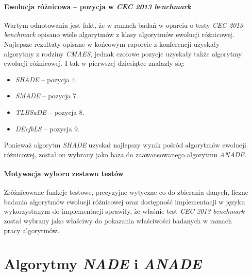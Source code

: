 \documentclass[12pt,a4paper]{report}
\begin{document}
{{{{{{\subsubsection{Ewolucja różnicowa -- pozycja w \emph{CEC 2013 benchmark}}
\par{
Wartym odnotowania jest fakt, że w ramach badań w oparciu o testy \emph{CEC 2013 benchmark} opisano wiele algorytmów z klasy algorytmów ewolucji różnicowej. Najlepsze rezultaty opisane w końcowym raporcie z konferencji \cite{CEC2013Comp} uzyskały algorytmy z rodziny \emph{CMAES}, jednak czołowe pozycje uzyskały także algorytmy ewolucji różnicowej. I tak w pierwszej dziesiątce znalazły się:
\begin{itemize}
\item \emph{SHADE} \cite{SHADE} -- pozycja 4.
\item \emph{SMADE} \cite{SMADE} -- pozycja 7.
\item \emph{TLBSaDE} \cite{TLBSaDE} -- pozycja 8.
\item \emph{DEcfbLS} \cite{DEcfbLS} -- pozycja 9.
\end{itemize}
}
\par{
Ponieważ algorytm \emph{SHADE} uzyskał najlepszy wynik pośród algorytmów ewolucji różnicowej, został on wybrany jako baza do zaawansowanego algorytmu \emph{ANADE}.
}

\subsubsection{Motywacja wyboru zestawu testów}
\par{
Zróżnicowane funkcje testowe, precyzyjne wytyczne co do zbierania danych, liczne badania algorytmów ewolucji różnicowej oraz dostępność implementacji w języku wykorzystanym do implementacji sprawiły, że właśnie test \emph{CEC 2013 benchmark} został wybrany jako właściwy do pokazania właściwości badanych w ramach pracy algorytmów.
}

\chapter{Algorytmy \emph{NADE} i \emph{ANADE}}
}}}}}}
\end{document}
